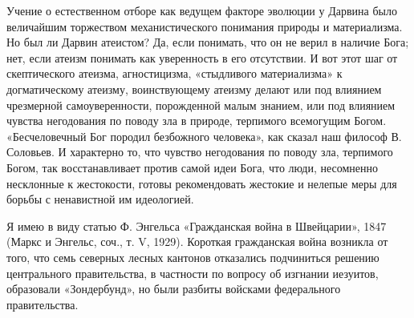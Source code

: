 Учение о  естественном отборе как  ведущем факторе эволюции  у Дарвина
было  величайшим  торжеством   механистического  понимания  природы  и
материализма. Но был ли Дарвин атеистом?  Да, если понимать, что он не
верил в наличие Бога; нет, если  атеизм понимать как уверенность в его
отсутствии.  И вот  этот шаг  от скептического  атеизма, агностицизма,
«стыдливого  материализма»  к  догматическому  атеизму,  воинствующему
атеизму   делают   или   под  влиянием   чрезмерной   самоуверенности,
порожденной  малым знанием,  или под  влиянием чувства  негодования по
поводу зла  в природе, терпимого всемогущим  Богом. «Бесчеловечный Бог
породил безбожного  человека», как сказал  наш философ В.  Соловьев. И
характерно то, что чувство негодования по поводу зла, терпимого Богом,
так  восстанавливает  против самой  идеи  Бога,  что люди,  несомненно
несклонные к жестокости, готовы  рекомендовать жестокие и нелепые меры
для борьбы с ненавистной им идеологией.

Я имею в виду статью Ф. Энгельса «Гражданская война в Швейцарии», 1847
(Маркс  и  Энгельс, соч.,  т.  V,  1929). Короткая  гражданская  война
возникла  от  того,  что  семь  северных  лесных  кантонов  отказались
подчиниться решению центрального правительства, в частности по вопросу
об  изгнании  иезуитов,  образовали   «Зондербунд»,  но  были  разбиты
войсками федерального правительства.

